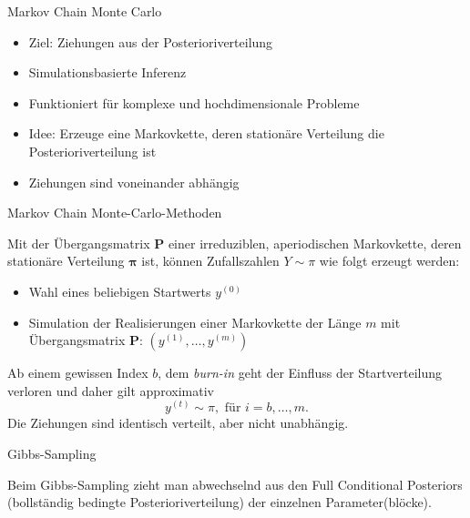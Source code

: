 \documentclass[ignorenonframetext,]{beamer}
\providecommand{\tightlist}{%
\setlength{\itemsep}{0pt}\setlength{\parskip}{0pt}}
\begin{document}
\begin{frame}{Markov Chain Monte Carlo}

\begin{itemize}
\tightlist
\item
  Ziel: Ziehungen aus der Posterioriverteilung
\item
  Simulationsbasierte Inferenz
\item
  Funktioniert für komplexe und hochdimensionale Probleme
\item
  Idee: Erzeuge eine Markovkette, deren stationäre Verteilung die
  Posterioriverteilung ist
\item
  Ziehungen sind voneinander abhängig
\end{itemize}

\end{frame}

\begin{frame}{Markov Chain Monte-Carlo-Methoden}

Mit der Übergangsmatrix \(\bm{P}\) einer irreduziblen, aperiodischen
Markovkette, deren stationäre Verteilung \(\bm{\pi}\) ist, können
Zufallszahlen \(Y \sim \pi\) wie folgt erzeugt werden:

\begin{itemize}
\item Wahl eines beliebigen Startwerts $y^{(0)}$
\item Simulation der Realisierungen einer Markovkette der Länge $m$ mit Übergangsmatrix $\bm{P}$: $(y^{(1)},\ldots,y^{(m)})$
\end{itemize}

Ab einem gewissen Index \(b\), dem \textit{burn-in} geht der Einfluss
der Startverteilung verloren und daher gilt approximativ \[
y^{(t)}\sim \pi, \text{ für } i=b,\ldots,m.
\] Die Ziehungen sind identisch verteilt, aber nicht unabhängig.

\end{frame}

\begin{frame}{Gibbs-Sampling}

Beim Gibbs-Sampling zieht man abwechselnd aus den Full Conditional
Posteriors (bollständig bedingte Posterioriverteilung) der einzelnen
Parameter(blöcke).

\end{frame}
\end{document}
